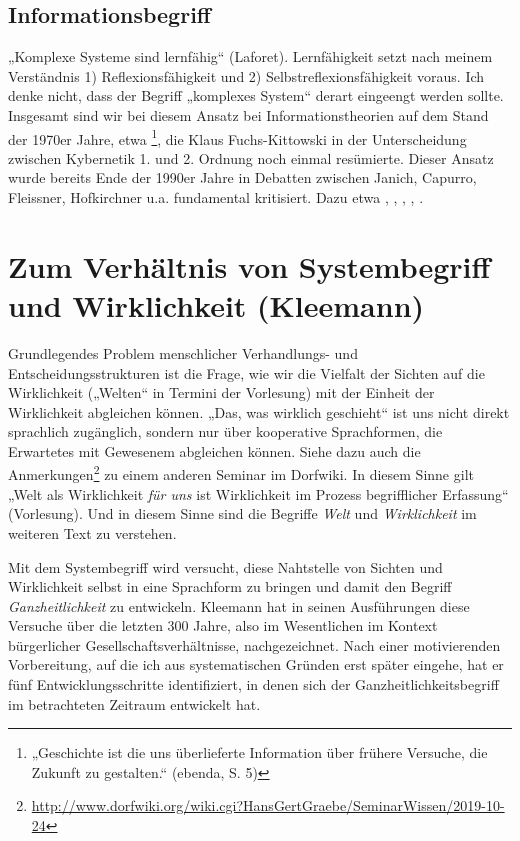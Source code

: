 \documentclass[11pt,a4paper]{article}
\begin{document}
\subsection{Informationsbegriff}

„Komplexe Systeme sind lernfähig“ (Laforet). Lernfähigkeit setzt nach meinem
Verständnis 1) Reflexionsfähigkeit und 2) Selbstreflexionsfähigkeit voraus.
Ich denke nicht, dass der Begriff „komplexes System“ derart eingeengt werden
sollte.  Insgesamt sind wir bei diesem Ansatz bei Informationstheorien auf dem
Stand der 1970er Jahre, etwa \cite{Steinbuch1969}\footnote{„Geschichte ist die
  uns überlieferte Information über frühere Versuche, die Zukunft zu
  gestalten.“ (ebenda, S. 5)}, die Klaus Fuchs-Kittowski \cite{KFK2002} in der
Unterscheidung zwischen Kybernetik 1. und 2. Ordnung noch einmal resümierte.
Dieser Ansatz wurde bereits Ende der 1990er Jahre in Debatten zwischen Janich,
Capurro, Fleissner, Hofkirchner u.a. fundamental kritisiert. Dazu etwa
\cite{Janich2006}, \cite{Capurro1996}, \cite{Capurro1998}, \cite{Capurro2002},
\cite{Klemm2003}.

\section{Zum Verhältnis von Systembegriff und Wirklichkeit (Kleemann)}

Grundlegendes Problem menschlicher Verhandlungs- und Entscheidungsstrukturen
ist die Frage, wie wir die Vielfalt der Sichten auf die Wirklichkeit („Welten“
in Termini der Vorlesung) mit der Einheit der Wirklichkeit abgleichen
können. „Das, was wirklich geschieht“ ist uns nicht direkt sprachlich
zugänglich, sondern nur über kooperative Sprachformen, die Erwartetes mit
Gewesenem abgleichen können. Siehe dazu auch die
Anmerkungen\footnote{\url{http://www.dorfwiki.org/wiki.cgi?HansGertGraebe/SeminarWissen/2019-10-24}}
zu einem anderen Seminar im Dorfwiki. In diesem Sinne gilt „Welt als
Wirklichkeit \emph{für uns} ist Wirklichkeit im Prozess begriff\-licher
Erfassung“ (Vorlesung). Und in diesem Sinne sind die Begriffe \emph{Welt} und
\emph{Wirklichkeit} im weiteren Text zu verstehen.

Mit dem Systembegriff wird versucht, diese Nahtstelle von Sichten und
Wirklichkeit selbst in eine Sprachform zu bringen und damit den Begriff
\emph{Ganzheitlichkeit} zu entwickeln. Kleemann hat in seinen Ausführungen
diese Versuche über die letzten 300 Jahre, also im Wesentlichen im Kontext
bürgerlicher Gesellschaftsverhältnisse, nachgezeichnet. Nach einer
motivierenden Vorbereitung, auf die ich aus systematischen Gründen erst später
eingehe, hat er fünf Entwicklungsschritte identifiziert, in denen sich der
Ganzheitlichkeitsbegriff im betrachteten Zeitraum entwickelt hat.
\end{document}
